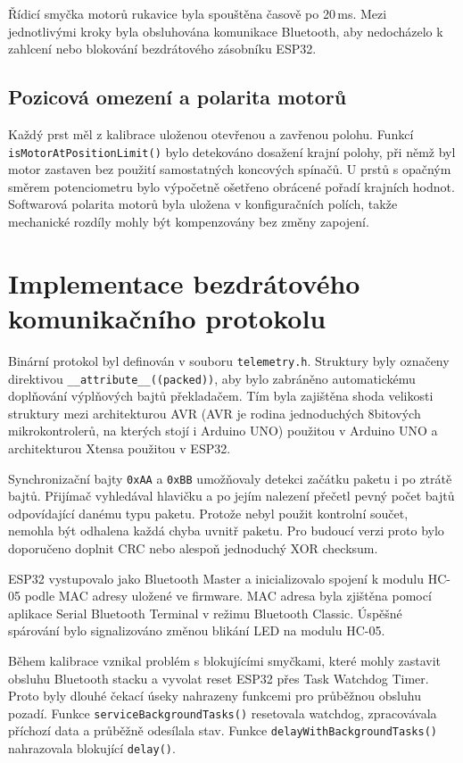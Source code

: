 \documentclass[FZS,DP]{tulthesis}
\begin{document}
Řídicí smyčka motorů rukavice byla spouštěna časově po 20\,ms. Mezi jednotlivými kroky byla obsluhována komunikace Bluetooth, aby nedocházelo k zahlcení nebo blokování bezdrátového zásobníku ESP32.

\subsection{Pozicová omezení a polarita motorů}
\label{subsec:pozicova-omezeni}

Každý prst měl z kalibrace uloženou otevřenou a zavřenou polohu. Funkcí \texttt{isMotorAtPositionLimit()} bylo detekováno dosažení krajní polohy, při němž byl motor zastaven bez použití samostatných koncových spínačů. U prstů s opačným směrem potenciometru bylo výpočetně ošetřeno obrácené pořadí krajních hodnot. Softwarová polarita motorů byla uložena v konfiguračních polích, takže mechanické rozdíly mohly být kompenzovány bez změny zapojení.

\section{Implementace bezdrátového komunikačního protokolu}
\label{sec:implementace-bt-protokolu}

Binární protokol byl definován v souboru \texttt{telemetry.h}. Struktury byly označeny direktivou \texttt{\_\_attribute\_\_((packed))}, aby bylo zabráněno automatickému doplňování výplňových bajtů překladačem. Tím byla zajištěna shoda velikosti struktury mezi architekturou AVR (AVR je rodina jednoduchých 8bitových mikrokontrolerů, na kterých stojí i Arduino UNO) použitou v Arduino UNO a architekturou Xtensa použitou v ESP32.

Synchronizační bajty \texttt{0xAA} a \texttt{0xBB} umožňovaly detekci začátku paketu i po ztrátě bajtů. Přijímač vyhledával hlavičku a po jejím nalezení přečetl pevný počet bajtů odpovídající danému typu paketu. Protože nebyl použit kontrolní součet, nemohla být odhalena každá chyba uvnitř paketu. Pro budoucí verzi proto bylo doporučeno doplnit CRC nebo alespoň jednoduchý XOR checksum.

ESP32 vystupovalo jako Bluetooth Master a inicializovalo spojení k modulu HC-05 podle MAC adresy uložené ve firmware. MAC adresa byla zjištěna pomocí aplikace Serial Bluetooth Terminal v režimu Bluetooth Classic. Úspěšné spárování bylo signalizováno změnou blikání LED na modulu HC-05.

Během kalibrace vznikal problém s blokujícími smyčkami, které mohly zastavit obsluhu Bluetooth stacku a vyvolat reset ESP32 přes Task Watchdog Timer. Proto byly dlouhé čekací úseky nahrazeny funkcemi pro průběžnou obsluhu pozadí. Funkce \texttt{serviceBackgroundTasks()} resetovala watchdog, zpracovávala příchozí data a průběžně odesílala stav. Funkce \texttt{delayWithBackgroundTasks()} nahrazovala blokující \texttt{delay()}.
\end{document}
